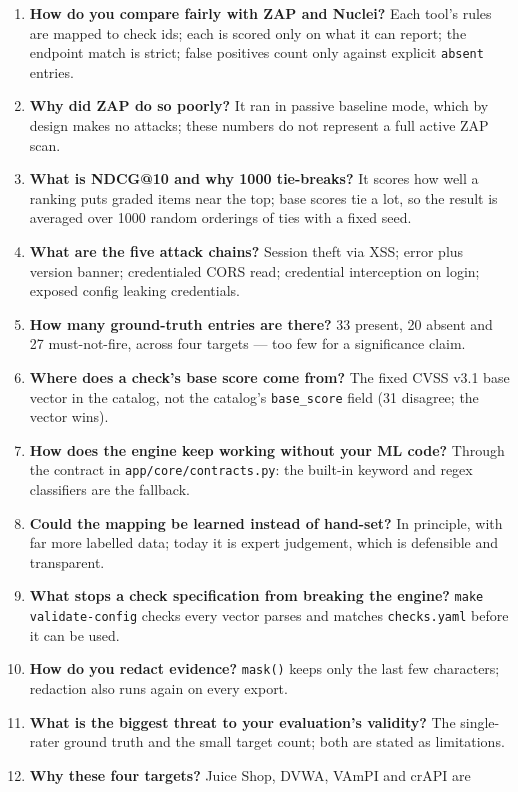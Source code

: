 \begin{enumerate}[leftmargin=*,itemsep=3pt]
install light; the keyword classifier needs no model. The anchor set is the
better, optional path.
\item \textbf{How do you compare fairly with ZAP and Nuclei?} Each tool's rules
are mapped to check ids; each is scored only on what it can report; the endpoint
match is strict; false positives count only against explicit \texttt{absent}
entries.
\item \textbf{Why did ZAP do so poorly?} It ran in passive baseline mode, which
by design makes no attacks; these numbers do not represent a full active ZAP
scan.
\item \textbf{What is NDCG@10 and why 1000 tie-breaks?} It scores how well a
ranking puts graded items near the top; base scores tie a lot, so the result is
averaged over 1000 random orderings of ties with a fixed seed.
\item \textbf{What are the five attack chains?} Session theft via XSS; error plus
version banner; credentialed CORS read; credential interception on login; exposed
config leaking credentials.
\item \textbf{How many ground-truth entries are there?} 33 present, 20 absent and
27 must-not-fire, across four targets --- too few for a significance claim.
\item \textbf{Where does a check's base score come from?} The fixed CVSS v3.1
base vector in the catalog, not the catalog's \texttt{base\_score} field (31
disagree; the vector wins).
\item \textbf{How does the engine keep working without your ML code?} Through the
contract in \texttt{app/core/contracts.py}: the built-in keyword and regex
classifiers are the fallback.
\item \textbf{Could the mapping be learned instead of hand-set?} In principle,
with far more labelled data; today it is expert judgement, which is defensible
and transparent.
\item \textbf{What stops a check specification from breaking the engine?}
\texttt{make validate-config} checks every vector parses and matches
\texttt{checks.yaml} before it can be used.
\item \textbf{How do you redact evidence?} \texttt{mask()} keeps only the last few
characters; redaction also runs again on every export.
\item \textbf{What is the biggest threat to your evaluation's validity?} The
single-rater ground truth and the small target count; both are stated as
limitations.
\item \textbf{Why these four targets?} Juice Shop, DVWA, VAmPI and crAPI are

\end{enumerate}
